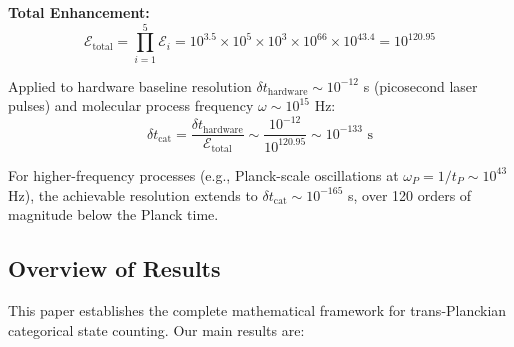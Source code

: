 \documentclass[twocolumn,10pt]{article}
\theoremstyle{remark}
\begin{document}
\textbf{Total Enhancement:}
\begin{equation}
    \mathcal{E}_{\text{total}} = \prod_{i=1}^{5} \mathcal{E}_i = 10^{3.5} \times 10^{5} \times 10^{3} \times 10^{66} \times 10^{43.4} = 10^{120.95}
\end{equation}

Applied to hardware baseline resolution $\delta t_{\text{hardware}} \sim 10^{-12}$ s (picosecond laser pulses) and molecular process frequency $\omega \sim 10^{15}$ Hz:
\begin{equation}
    \delta t_{\text{cat}} = \frac{\delta t_{\text{hardware}}}{\mathcal{E}_{\text{total}}} \sim \frac{10^{-12}}{10^{120.95}} \sim 10^{-133} \text{ s}
\end{equation}

For higher-frequency processes (e.g., Planck-scale oscillations at $\omega_P = 1/t_P \sim 10^{43}$ Hz), the achievable resolution extends to $\delta t_{\text{cat}} \sim 10^{-165}$ s, over 120 orders of magnitude below the Planck time.

\subsection{Overview of Results}

This paper establishes the complete mathematical framework for trans-Planckian categorical state counting. Our main results are:
\end{document}
